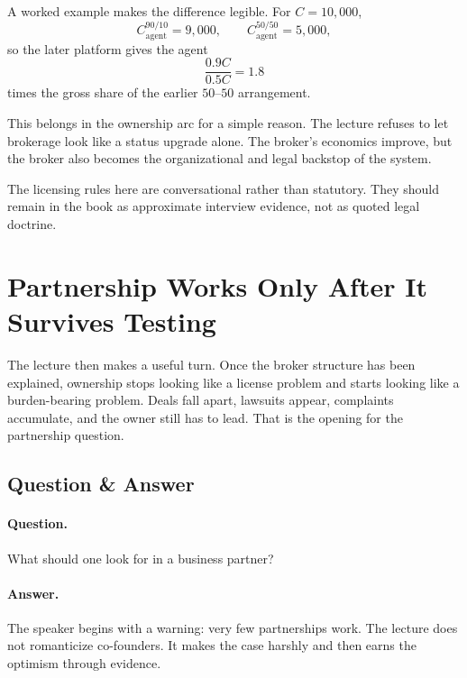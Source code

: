 \documentclass[11pt,oneside]{book}
\begin{document}
A worked example makes the difference legible. For \(C=10{,}000\),
\begin{equation}
C_{\mathrm{agent}}^{90/10}=9{,}000,
\qquad
C_{\mathrm{agent}}^{50/50}=5{,}000,
\end{equation}
so the later platform gives the agent
\begin{equation}
\frac{0.9C}{0.5C}=1.8
\end{equation}
times the gross share of the earlier \(50\text{--}50\) arrangement.

This belongs in the ownership arc for a simple reason. The lecture refuses to let brokerage look like a status upgrade alone. The broker's economics improve, but the broker also becomes the organizational and legal backstop of the system.

\begin{remark}
The licensing rules here are conversational rather than statutory. They should remain in the book as approximate interview evidence, not as quoted legal doctrine.
\end{remark}

\section{Partnership Works Only After It Survives Testing}

The lecture then makes a useful turn. Once the broker structure has been explained, ownership stops looking like a license problem and starts looking like a burden-bearing problem. Deals fall apart, lawsuits appear, complaints accumulate, and the owner still has to lead. That is the opening for the partnership question.

\subsection{Question \& Answer}

\paragraph{Question.}
What should one look for in a business partner?

\paragraph{Answer.}
The speaker begins with a warning: very few partnerships work. The lecture does not romanticize co-founders. It makes the case harshly and then earns the optimism through evidence.
\end{document}
